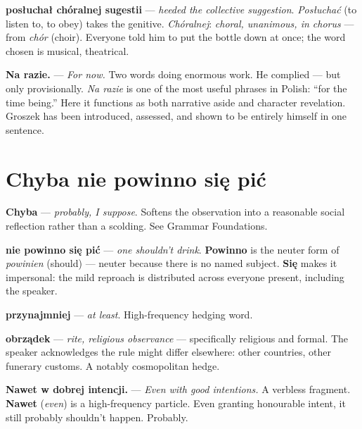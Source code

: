 \textbf{posłuchał chóralnej sugestii} — \textit{heeded the collective suggestion}. 
\textit{Posłuchać} (to listen to, to obey) takes the genitive. 
\textit{Chóralnej}: \textit{choral, unanimous, in chorus} — from \textit{chór} 
(choir). Everyone told him to put the bottle down at once; the word chosen 
is musical, theatrical.

\textbf{Na razie.} — \textit{For now.} Two words doing enormous work. 
He complied — but only provisionally. \textit{Na razie} is one of the most 
useful phrases in Polish: ``for the time being.'' Here it functions as both 
narrative aside and character revelation. Groszek has been introduced, 
assessed, and shown to be entirely himself in one sentence.

\section{Chyba nie powinno się pić}


\textbf{Chyba} --- \textit{probably, I suppose}. Softens the observation into 
a reasonable social reflection rather than a scolding. See Grammar Foundations.

\textbf{nie powinno się pić} --- \textit{one shouldn't drink}. \textbf{Powinno} 
is the neuter form of \textit{powinien} (should) --- neuter because there is no 
named subject. \textbf{Się} makes it impersonal: the mild reproach is distributed 
across everyone present, including the speaker.

\textbf{przynajmniej} --- \textit{at least}. High-frequency hedging word.

\textbf{obrządek} --- \textit{rite, religious observance} --- specifically 
religious and formal. The speaker acknowledges the rule might differ elsewhere: 
other countries, other funerary customs. A notably cosmopolitan hedge.

\textbf{Nawet w dobrej intencji.} --- \textit{Even with good intentions.} 
A verbless fragment. \textbf{Nawet} (\textit{even}) is a high-frequency particle. 
Even granting honourable intent, it still probably shouldn't happen. Probably.

